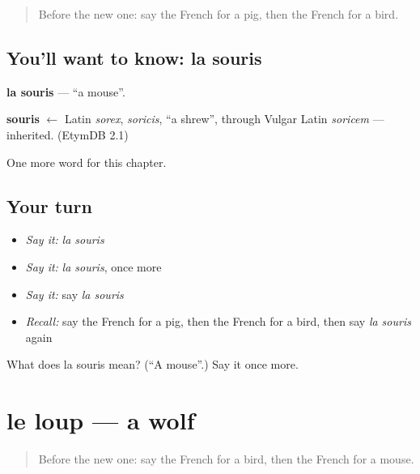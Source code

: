 \label{lesson:FR-C85-souris}



\begin{quote}
Before the new one: say the French for a pig, then the French for a bird.
\end{quote}

\subsection*{You'll want to know: la souris}
\textbf{la souris} — \textquotedblleft{}a mouse\textquotedblright{}.

\begin{cousinweb}
\textbf{souris} $\leftarrow$ Latin \emph{sorex}, \emph{soricis}, \textquotedblleft{}a shrew\textquotedblright{}, through Vulgar Latin \emph{soricem} — inherited. (EtymDB 2.1)
\end{cousinweb}

\begin{grammarlens}[title={What you've built}]
One more word for this chapter.
\end{grammarlens}

\subsection*{Your turn}
\begin{itemize}
\raggedright
  \item \emph{Say it:} \emph{la souris}
  \item \emph{Say it:} \emph{la souris}, once more
  \item \emph{Say it:} say \emph{la souris}
  \item \emph{Recall:} say the French for a pig, then the French for a bird, then say \emph{la souris} again
\end{itemize}

\begin{tcolorbox}[breakable,colback=teal!4,colframe=teal!35!black,title={Before you move on}]
What does la souris mean? (\textquotedblleft{}A mouse\textquotedblright{}.) Say it once more.
\end{tcolorbox}
\section[le loup]{le loup — a wolf}

\label{lesson:FR-C85-loup}



\begin{quote}
Before the new one: say the French for a bird, then the French for a mouse.
\end{quote}

